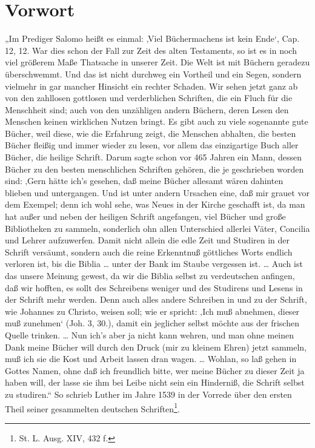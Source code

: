\chapter[Vorwort]{Vorwort}

„Im Prediger Salomo heißt es einmal: ‚Viel Büchermachens ist kein Ende‘, Cap. 12, 12. War dies schon der Fall zur Zeit des alten Testaments, so ist es in noch viel größerem Maße Thatsache in unserer Zeit. Die Welt ist mit Büchern geradezu überschwemmt. Und das ist nicht durchweg ein Vortheil und ein Segen, sondern vielmehr in gar mancher Hinsicht ein rechter Schaden. Wir sehen jetzt ganz ab von den zahllosen gottlosen und verderblichen Schriften, die ein Fluch für die Menschheit sind; auch von den unzähligen andern Büchern, deren Lesen den Menschen keinen wirklichen Nutzen bringt. Es gibt auch zu viele sogenannte gute Bücher, weil diese, wie die Erfahrung zeigt, die Menschen abhalten, die besten Bücher fleißig und immer wieder zu lesen, vor allem das einzigartige Buch aller Bücher, die heilige Schrift. Darum sagte schon vor 465 Jahren ein Mann, dessen Bücher zu den besten menschlichen Schriften gehören, die je geschrieben worden sind: ‚Gern hätte ich’s gesehen, daß meine Bücher allesamt wären dahinten blieben und untergangen. Und ist unter andern Ursachen eine, daß mir grauet vor dem Exempel; denn ich wohl sehe, was Neues in der Kirche geschafft ist, da man hat außer und neben der heiligen Schrift angefangen, viel Bücher und große Bibliotheken zu sammeln, sonderlich ohn allen Unterschied allerlei Väter, Concilia und Lehrer aufzuwerfen. Damit nicht allein die edle Zeit und Studiren in der Schrift versäumt, sondern auch die reine Erkenntnuß göttliches Worts endlich verloren ist, bis die Biblia … unter der Bank im Staube vergessen ist. … Auch ist das unsere Meinung gewest, da wir die Biblia selbst zu verdeutschen anfingen, daß wir hofften, es sollt des Schreibens weniger und des Studirens und Lesens in der Schrift mehr werden. Denn auch alles andere Schreiben in und zu der Schrift, wie Johannes zu Christo, weisen soll; wie er spricht: ‚Ich muß abnehmen, dieser muß zunehmen‘ (Joh. 3, 30.), damit ein jeglicher selbst möchte aus der frischen Quelle trinken. … Nun ich’s aber ja nicht kann wehren, und man ohne meinen Dank meine Bücher will durch den Druck (mir zu kleinem Ehren) jetzt sammeln, muß ich sie die Kost und Arbeit lassen dran wagen. … Wohlan, so laß gehen in Gottes Namen, ohne daß ich freundlich bitte, wer meine Bücher zu dieser Zeit ja haben will, der lasse sie ihm bei Leibe nicht sein ein Hinderniß, die Schrift selbst zu studiren.“ So schrieb Luther im Jahre 1539 in der Vorrede über den ersten Theil seiner gesammelten deutschen Schriften\footnote{St. L. Ausg. XIV, 432 f.}.

